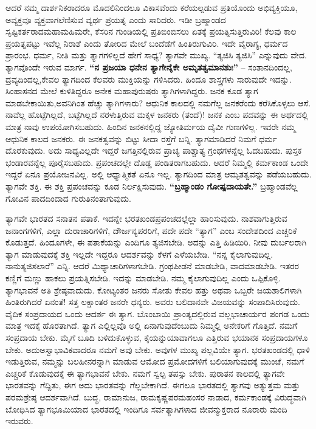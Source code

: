 ಆದರೆ ನಮ್ಮ ದಾರ್ಶನಿಕರಾದರೂ ಮೊದಲಿನಿಂದಲೂ ವಿಕಾಸವೆಂದು ಕರೆಯಲ್ಪಡುವ ಪ್ರತಿಯೊಂದು ಅಭಿವ್ಯಕ್ತಿಯೂ, ಅವ್ಯಕ್ತವೂ ವ್ಯಕ್ತವಾಗಲೆಣಿಸುವ ವ್ಯರ್ಥ ಪ್ರಯತ್ನ ಎಂದು ಸಾರಿದರು. ಇಡೀ ಬ್ರಹ್ಮಾಂಡದ ಸೃಷ್ಟಿಕರ್ತರಾದ\break ಮಹಾಮಹಿಮರೇ, ಕೆಸರಿನ ಗುಂಡಿಯಲ್ಲಿ ಪ್ರತಿಬಿಂಬಿಸಲು ಏತಕ್ಕೆ ಪ್ರಯತ್ನಿಸು\-ತ್ತಿರುವಿರಿ! ಕೆಲವು ಕಾಲ ಪ್ರಯತ್ನಪಟ್ಟು ಇವೆಲ್ಲ ನಿರಾಶೆ ಎಂದು ತೋರಿದ ಮೇಲೆ ಬಂದೆಡೆಗೆ ಹಿಂತಿರುಗುವಿರಿ. ಇದೇ ವೈರಾಗ್ಯ, ಧರ್ಮದ ಪ್ರಾರಂಭ. ಧರ್ಮ, ನೀತಿ ಮತ್ತು ತ್ಯಾಗಗಳಿಲ್ಲದೆ ಹೇಗೆ ಸಾಧ್ಯ? ತ್ಯಾಗವೇ ಮುಖ್ಯ. “ತ್ಯಜಿಸಿ ತ್ಯಜಿಸಿ” ಎನ್ನುವುದು ವೇದ. ತ್ಯಾಗವೊಂದೇ ಇರುವ ಮಾರ್ಗ. \textbf{“ನ ಪ್ರಜಯಾ ಧನೇನ ತ್ಯಾಗೇನೈಕೇ ಅಮೃತತ್ವಮಾನಶುಃ”} – ಸಂತಾನದಿಂದಲ್ಲ, ದ್ರವ್ಯದಿಂದಲ್ಲ,\break ಕೇವಲ ತ್ಯಾಗದಿಂದ ಕೆಲವರು ಮುಕ್ತಿಯನ್ನು ಗಳಿಸಿದರು. ಹಿಂದೂ ಶಾಸ್ತ್ರಗಳು ಸಾರುವುದೇ ಇದನ್ನು. ಸಿಂಹಾಸನದ ಮೇಲೆ ಕುಳಿತಿದ್ದರೂ ಅನೇಕ ಮಹಾಪುರುಷರು ತ್ಯಾಗಿಗಳಾಗಿದ್ದರು. ಜನಕ ಕೂಡ ತ್ಯಾಗ ಮಾಡಬೇಕಾಯಿತು,\break ಅವನಿಗಿಂತ ಹೆಚ್ಚು ತ್ಯಾಗಿಗಳಾರು? ಆಧುನಿಕ ಕಾಲದಲ್ಲಿ ನಮಗೆಲ್ಲ ಜನಕರೆಂದು ಕರೆಸಿಕೊಳ್ಳಲು ಆಸೆ. ನಾವೆಲ್ಲ ಹೊಟ್ಟೆಗಿಲ್ಲದೆ, ಬಟ್ಟೆಗಿಲ್ಲದೆ ನರಳುತ್ತಿರುವ ಮಕ್ಕಳ ಜನಕರು (ತಂದೆ)! ಜನಕ ಎಂಬ ಪದವನ್ನು ಈ ಅರ್ಥದಲ್ಲಿ ಮಾತ್ರ ನಾವು ಉಪಯೋಗಿಸಬಹುದು. ಹಿಂದಿನ ಜನಕನಲ್ಲಿದ್ದ ಜ್ಯೋತಿರ್ಮಯ ದೈವೀ ಗುಣಗಳಿಲ್ಲ. ಇವರೇ ನಮ್ಮ ಆಧುನಿಕ ಕಾಲದ ಜನಕರು. ಈ ಜನಕತ್ವವನ್ನು ಬಿಟ್ಟು ಸೀದಾ ರಸ್ತೆಗೆ ಬನ್ನಿ. ತ್ಯಾಗಮಾಡಿದರೆ ನಿಮಗೆ ಧರ್ಮ ದೊರಕುವುದು. ಅದು ಸಾಧ್ಯವಿಲ್ಲದೇ ಇದ್ದರೆ ಜಗತ್ತಿನಲ್ಲಿರುವ ಪ್ರಾಚ್ಯ ಪಾಶ್ಚಾತ್ಯ ಗ್ರಂಥಗಳನ್ನೆಲ್ಲ ಓದಬಹುದು. ಪುಸ್ತಕ ಭಂಡಾರವನ್ನೆಲ್ಲ ಪೂರೈಸಬಹುದು. ಪ್ರಪಂಚದಲ್ಲೇ ದೊಡ್ಡ ಪಂಡಿತರಾಗಬಹುದು. ಆದರೆ ನಿಮ್ಮಲ್ಲಿ ಕರ್ಮಕಾಂಡ ಒಂದೇ ಇದ್ದರೆ ಏನೂ ಪ್ರಯೋಜನವಿಲ್ಲ. ಅಲ್ಲಿ ಆಧ್ಯಾತ್ಮಿಕತೆ ಏನೂ ಇಲ್ಲ. ತ್ಯಾಗದಿಂದ ಮಾತ್ರ ಆಮೃತತ್ವವನ್ನು ಪಡೆಯಬಹುದು. ತ್ಯಾಗವೇ ಶಕ್ತಿ. ಈ ಶಕ್ತಿ ಪ್ರಪಂಚವನ್ನು ಕೂಡ ನಿರ್ಲಕ್ಷಿಸುವುದು. \textbf{“ಬ್ರಹ್ಮಾಂಡಂ ಗೋಷ್ಪದಾಯತೇ.”} ಬ್ರಹ್ಮಾಂಡವೆಲ್ಲ ಗೋವಿನ ಪಾದದಿಂದಾದ ಗುರುತಿನಂತಾಗುವುದು.

ತ್ಯಾಗವೇ ಭಾರತದ ಸನಾತನ ಪತಾಕೆ. ಇದನ್ನೇ ಭರತಖಂಡಪ್ರಪಂಚದಲ್ಲೆಲ್ಲಾ ಹಾರಿಸುವುದು. ನಾಶವಾಗುತ್ತಿರುವ ಜನಾಂಗಗಳಿಗೆ, ಎಲ್ಲಾ ದುರಾಚಾರಿಗಳಿಗೆ, ದೌರ್ಜನ್ಯಪರರಿಗೆ, ಪದೇ ಪದೇ “ತ್ಯಾಗ” ಎಂಬ ಸಂದೇಶದಿಂದ ಎಚ್ಚರಿಕೆ ಕೊಡುತ್ತದೆ. ಹಿಂದೂಗಳೇ, ಈ ಪತಾಕೆಯನ್ನು ಎಂದಿಗೂ ತ್ಯಜಿಸಬೇಡಿ. ಅದನ್ನು ಎತ್ತಿ ಹಿಡಿಯಿರಿ. ನೀವು ದುರ್ಬಲರಾಗಿ ತ್ಯಾಗ ಮಾಡುವುದಕ್ಕೆ ಶಕ್ತಿ ಇಲ್ಲದೇ ಇದ್ದರೂ ಆದರ್ಶವನ್ನು ಕೆಳಗೆ ಎಳೆಯಬೇಡಿ. “ನನ್ನ ಕೈಲಾಗುವುದಿಲ್ಲ. ನಾನು\break ತ್ಯಜಿಸಲಾರೆ” ಎನ್ನಿ. ಆದರೆ ಮಿಥ್ಯಾಚಾರಿಗಳಾಗಬೇಡಿ. ಗ್ರಂಥಪೀಡನೆ ಮಾಡಬೇಡಿ, ವಾದಮಾಡಬೇಡಿ. ಇತರರ ಕಣ್ಣಿಗೆ ಮಣ್ಣು ಹಾಕಲು ಪ್ರಯತ್ನಿಸಬೇಡಿ. ಇದನ್ನು ಮಾಡಬೇಡಿ. ನಮ್ಮ ಕೈಲಾಗುವುದಿಲ್ಲ ಎಂದು ಒಪ್ಪಿಕೊಳ್ಳಿ. ತ್ಯಾಗಭಾವನೆ ಅತಿ ಶ್ರೇಷ್ಠವಾದುದು. ಕೋಟ್ಯಂತರ ಜನರು ಸೋತು ಕೇವಲ ಹತ್ತು ಅಥವಾ ಒಬ್ಬರೇ ಜಯಶಾಲಿಗಳಾಗಿ ಹಿಂತಿರುಗಿದರೆ ಏನಂತೆ! ಸತ್ತ ಲಕ್ಷಾಂತರ ಜನರೇ ಧನ್ಯರು. ಅವರು ಬಲಿದಾನವೇ ವಿಜಯವನ್ನು ಸಂಪಾದಿಸಿರುವುದು. ವೈದಿಕ ಸಂಪ್ರದಾಯದ ಒಂದು ಆದರ್ಶ ಈ ತ್ಯಾಗ. ಬೊಂಬಾಯಿ ಪ್ರಾಂತ್ಯದಲ್ಲಿರುವ ವಲ್ಲಭಾಚಾರ್ಯರ ಪಂಗಡ ಒಂದು ಮಾತ್ರ ಇದಕ್ಕೆ ಹೊರತಾಗಿದೆ. ತ್ಯಾಗ ಎಲ್ಲಿಲ್ಲವೊ ಅಲ್ಲಿ ಏನಾಗುವುದೆಂಬುದು ನಿಮ್ಮಲ್ಲಿ ಅನೇಕರಿಗೆ ಗೊತ್ತಿದೆ. ನಮಗೆ ಸಂಪ್ರದಾಯ ಬೇಕು. ಮೈಗೆ ಬೂದಿ ಬಳಿದುಕೊಳ್ಳುವ, ಕೈಯನ್ನು\break ಯಾವಾಗಲೂ ಎತ್ತಿರುವ ಭಯಾನಕ ಸಂಪ್ರದಾಯಗಳೂ ಬೇಕು. ಅದು\break ಅಸ್ವಾಭಾವಿಕವಾದರೂ ನಮಗೆ ಅವು ಬೇಕು. ಅವುಗಳ ಮುಖ್ಯ ಪಲ್ಲವಿಯೇ ತ್ಯಾಗ. ಭರತಖಂಡದಲ್ಲಿ ಧಾಳಿ ಇಡುತ್ತಿರುವ, ನಮ್ಮನ್ನು ಬಲಹೀನರನ್ನಾಗಿ ಮಾಡುವ ಆಮೋದ ಪ್ರಮೋದಗಳಿಗೆ ಬಲಿಯಾಗುವುದಕ್ಕೆ ಮುಂಚೆ, ನಮಗೆ ಎಚ್ಚರಿಕೆ ಕೊಡುವುದಕ್ಕೆ ಈ ತ್ಯಾಗಭಾವನೆ ಬೇಕು. ನಮಗೆ ಸ್ವಲ್ಪ ತಪಸ್ಸು ಬೇಕು. ಪುರಾತನ ಕಾಲದಲ್ಲಿ ತ್ಯಾಗವೇ ಭಾರತವನ್ನು ಗೆದ್ದಿತು, ಈಗ ಅದು ಭಾರತವನ್ನು ಗೆಲ್ಲಬೇಕಾಗಿದೆ. ಈಗಲೂ ಭಾರತದಲ್ಲಿ ತ್ಯಾಗವು ಅತ್ಯುತ್ತಮ ಮತ್ತು ಪರಮಶ್ರೇಷ್ಠ ಆದರ್ಶವಾಗಿದೆ. ಬುದ್ಧ, ರಾಮಾನುಜ, ರಾಮಕೃಷ್ಣ\break ಪರಮಹಂಸರ ನಾಡಾದ, ಕರ್ಮಕಾಂಡಕ್ಕೆ ವಿರುದ್ಧವಾಗಿ ಬೋಧಿಸಿದ ತ್ಯಾಗಭೂಮಿಯಾದ ಭಾರತದಲ್ಲಿ ಇಂದಿಗೂ ಸರ್ವತ್ಯಾಗಿಗಳಾದ ಜೀವನ್ಮುಕ್ತರಾದ ನೂರಾರು ಮಂದಿ ಇರುವರು.

